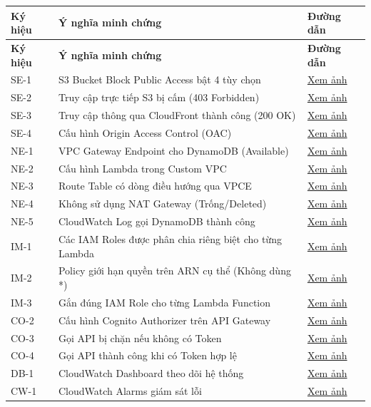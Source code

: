 \documentclass[13pt]{article}
\begin{document}
\begin{longtable}{|p{}|p{}|p{}|}
\hline
\textbf{Ký hiệu} & \textbf{Ý nghĩa minh chứng} & \textbf{Đường dẫn} \\ \hline
\endfirsthead
\hline
\textbf{Ký hiệu} & \textbf{Ý nghĩa minh chứng} & \textbf{Đường dẫn} \\ \hline
\endhead
SE-1 & S3 Bucket Block Public Access bật 4 tùy chọn & \hyperref[img:SE-1]{Xem ảnh} \\ \hline
SE-2 & Truy cập trực tiếp S3 bị cấm (403 Forbidden) & \hyperref[img:SE-2]{Xem ảnh} \\ \hline
SE-3 & Truy cập thông qua CloudFront thành công (200 OK) & \hyperref[img:SE-3]{Xem ảnh} \\ \hline
SE-4 & Cấu hình Origin Access Control (OAC) & \hyperref[img:SE-4]{Xem ảnh} \\ \hline
NE-1 & VPC Gateway Endpoint cho DynamoDB (Available) & \hyperref[img:NE-1]{Xem ảnh} \\ \hline
NE-2 & Cấu hình Lambda trong Custom VPC & \hyperref[img:NE-2.1]{Xem ảnh} \\ \hline
NE-3 & Route Table có dòng điều hướng qua VPCE & \hyperref[img:NE-3]{Xem ảnh} \\ \hline
NE-4 & Không sử dụng NAT Gateway (Trống/Deleted) & \hyperref[img:NE-4]{Xem ảnh} \\ \hline
NE-5 & CloudWatch Log gọi DynamoDB thành công & \hyperref[img:NE-5.1]{Xem ảnh} \\ \hline
IM-1 & Các IAM Roles được phân chia riêng biệt cho từng Lambda & \hyperref[img:IM-1]{Xem ảnh} \\ \hline
IM-2 & Policy giới hạn quyền trên ARN cụ thể (Không dùng *) & \hyperref[img:IM-2.1]{Xem ảnh} \\ \hline
IM-3 & Gắn đúng IAM Role cho từng Lambda Function & \hyperref[img:IM-3.1]{Xem ảnh} \\ \hline
CO-2 & Cấu hình Cognito Authorizer trên API Gateway & \hyperref[img:CO-2]{Xem ảnh} \\ \hline
CO-3 & Gọi API bị chặn nếu không có Token & \hyperref[img:CO-3]{Xem ảnh} \\ \hline
CO-4 & Gọi API thành công khi có Token hợp lệ & \hyperref[img:CO-4.1]{Xem ảnh} \\ \hline
DB-1 & CloudWatch Dashboard theo dõi hệ thống & \hyperref[img:DB-1]{Xem ảnh} \\ \hline
CW-1 & CloudWatch Alarms giám sát lỗi & \hyperref[img:CW-1]{Xem ảnh} \\ \hline

\end{longtable}
\end{document}
